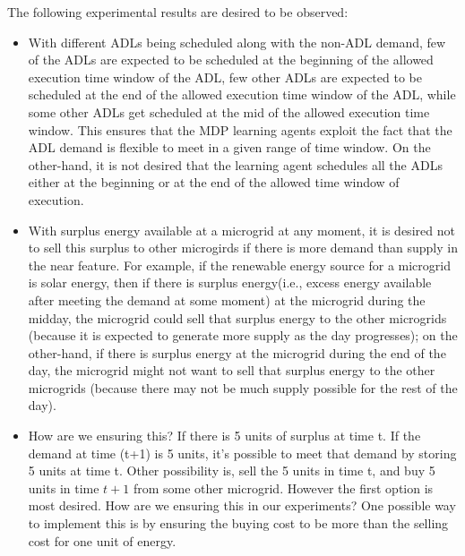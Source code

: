 \documentclass[conference]{IEEEtran}
\begin{document}
The following experimental results are desired to be observed:
\begin{itemize}
\item With different ADLs being scheduled along with the non-ADL demand, few of the ADLs are expected to be scheduled at the beginning of the allowed execution time window of the ADL, few other ADLs are expected to be scheduled at the end of the allowed execution time window of the ADL, while some other ADLs get scheduled at the mid of the allowed execution time window. This ensures that the MDP learning agents exploit the fact that the ADL demand is flexible to meet in a given range of time window. On the other-hand, it is not desired that the learning agent schedules all the ADLs either at the beginning or at the end of the allowed time window of execution.
\item With surplus energy available at a microgrid at any moment, it is desired not to sell this surplus to other microgirds if there is more demand than supply in the near feature. For example, if the renewable energy source for a microgrid is solar energy, then if there is surplus energy(i.e., excess energy available after meeting the demand at some moment) at the microgrid during the midday, the microgrid could sell that surplus energy to the other microgrids (because it is expected to generate more supply as the day progresses); on the other-hand, if there is surplus energy at the microgrid during the end of the day, the microgrid might not want to sell that surplus energy to the other microgrids (because there may not be much supply possible for the rest of the day).
\item How are we ensuring this? If there is 5 units of surplus at time t. If the demand at time (t+1) is 5 units, it's possible to meet that demand by storing 5 units at time t. Other possibility is, sell the 5 units in time t, and buy 5 units in time $t+1$ from some other microgrid. However the first option is most desired. How are we ensuring this in our experiments? One possible way to implement this is by ensuring the buying cost to be more than the selling cost for one unit of energy.   
\end{itemize}
\end{document}
